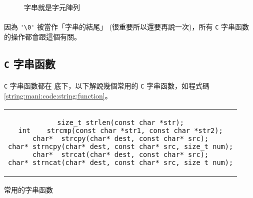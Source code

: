 \documentclass[12pt,a4paper,oneside]{report}
\begin{document}
\begin{CJK}{UTF8}{bkai}
\begin{figure}[h!]
  \centering
  \caption{字串就是字元陣列}
  \label{string:mani:fig:char:array}
\end{figure}

\paragraph{}因為 \lstinline!'\0'! 被當作「字串的結尾」 (很重要所以還要再說一次)，所有 \texttt{C} 字串函數的操作都會跟這個有關。

\subsection{\texttt{C} 字串函數}

\paragraph{}\texttt{C} 字串函數都在  底下，以下解說幾個常用的 \texttt{C} 字串函數，如程式碼 \ref{string:mani:code:string:function}。

\begin{code}[h!]
  \centering
  \begin{tabular}{c}
  \begin{lstlisting}
size_t strlen(const char *str);
int    strcmp(const char *str1, const char *str2);
char*  strcpy(char* dest, const char* src);
char* strncpy(char* dest, const char* src, size_t num);
char*  strcat(char* dest, const char* src);
char* strncat(char* dest, const char* src, size_t num);
  \end{lstlisting}
  \end{tabular}
  \caption{常用的字串函數}
  \label{string:mani:code:string:function}
\end{code}


\end{CJK}
\end{document}
